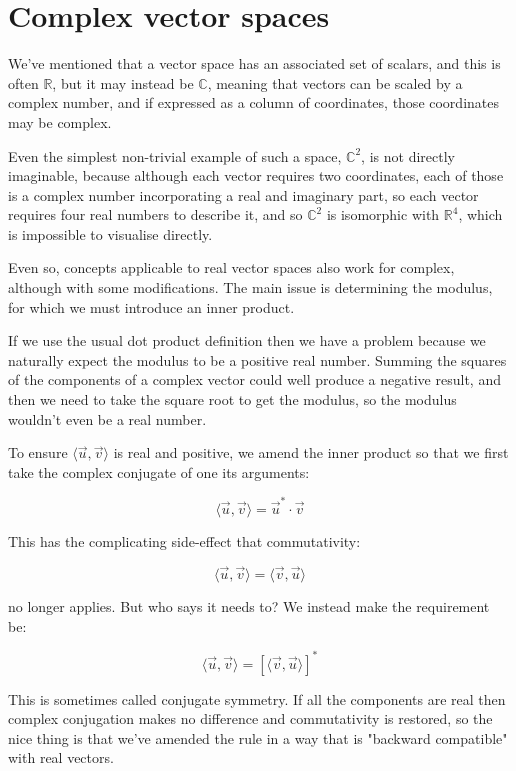 \section{Complex vector spaces}\label{sec:vectors-complex}

We've mentioned that a vector space has an associated set of scalars, and this is often $\mathbb{R}$, but it may instead be $\mathbb{C}$, meaning that vectors can be scaled by a complex number, and if expressed as a column of coordinates, those coordinates may be complex.

Even the simplest non-trivial example of such a space, $\mathbb{C}^2$, is not directly imaginable, because although each vector requires two coordinates, each of those is a complex number incorporating a real and imaginary part, so each vector requires four real numbers to describe it, and so $\mathbb{C}^2$ is isomorphic with $\mathbb{R}^4$, which is impossible to visualise directly.

Even so, concepts applicable to real vector spaces also work for complex, although with some modifications. The main issue is determining the modulus, for which we must introduce an inner product.

If we use the usual dot product definition then we have a problem because we naturally expect the modulus to be a positive real number. Summing the squares of the components of a complex vector could well produce a negative result, and then we need to take the square root to get the modulus, so the modulus wouldn't even be a real number.

To ensure $\langle \vec{u}, \vec{v} \rangle$ is real and positive, we amend the inner product so that we first take the complex conjugate of one its arguments:

$$
\langle \vec{u}, \vec{v} \rangle
=
\vec{u}^* \cdot \vec{v}
$$

This has the complicating side-effect that commutativity:

$$
\langle \vec{u}, \vec{v} \rangle
=
\langle \vec{v}, \vec{u} \rangle
$$

no longer applies. But who says it needs to? We instead make the requirement be:

$$
\langle \vec{u}, \vec{v} \rangle
=
\left[ \langle \vec{v}, \vec{u} \rangle \right]^*
$$

This is sometimes called conjugate symmetry. If all the components are real then complex conjugation makes no difference and commutativity is restored, so the nice thing is that we've amended the rule in a way that is "backward compatible" with real vectors.

